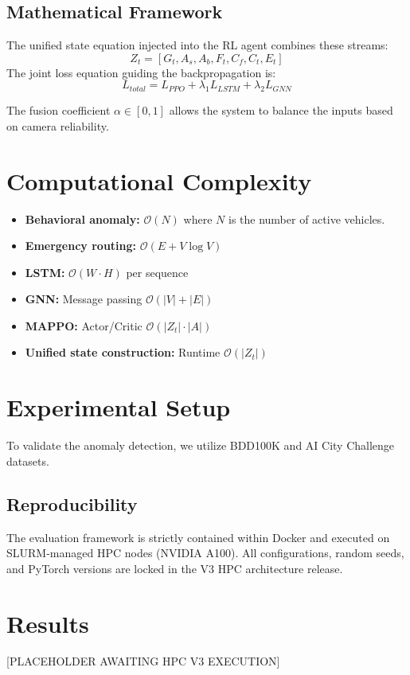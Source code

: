 \documentclass{ieeeaccess}
\begin{document}
\subsection{Mathematical Framework}
The unified state equation injected into the RL agent combines these streams:
$$Z_t = [G_t, A_s, A_b, F_t, C_f, C_t, E_t]$$
The joint loss equation guiding the backpropagation is:
$$L_{total} = L_{PPO} + \lambda_1 L_{LSTM} + \lambda_2 L_{GNN}$$

The fusion coefficient $\alpha \in [0,1]$ allows the system to balance the inputs based on camera reliability.

\section{Computational Complexity}
\label{sec:complexity}
\begin{itemize}
    \item \textbf{Behavioral anomaly:} $\mathcal{O}(N)$ where $N$ is the number of active vehicles.
    \item \textbf{Emergency routing:} $\mathcal{O}(E + V \log V)$
    \item \textbf{LSTM:} $\mathcal{O}(W \cdot H)$ per sequence
    \item \textbf{GNN:} Message passing $\mathcal{O}(|V| + |E|)$
    \item \textbf{MAPPO:} Actor/Critic $\mathcal{O}(|Z_t| \cdot |A|)$
    \item \textbf{Unified state construction:} Runtime $\mathcal{O}(|Z_t|)$
\end{itemize}

\section{Experimental Setup}
\label{sec:experimental_setup}
To validate the anomaly detection, we utilize BDD100K and AI City Challenge datasets. 
\subsection{Reproducibility}
The evaluation framework is strictly contained within Docker and executed on SLURM-managed HPC nodes (NVIDIA A100). All configurations, random seeds, and PyTorch versions are locked in the V3 HPC architecture release.

\section{Results}
\label{sec:results}
[PLACEHOLDER AWAITING HPC V3 EXECUTION]
\end{document}
